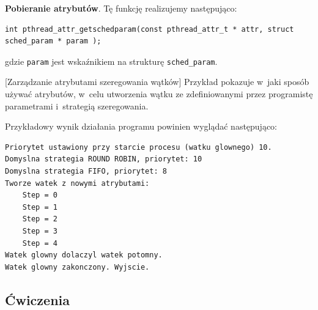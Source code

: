 \noindent\textbf{Pobieranie atrybutów}. Tę funkcję realizujemy następująco: 

\begin{lstlisting}[style=MyCStyle]
int pthread_attr_getschedparam(const pthread_attr_t * attr, struct sched_param * param );
\end{lstlisting}

gdzie \lstinline[style=MyCStyle]{param} jest wskaźnikiem na strukturę \lstinline[style=MyCStyle]{sched_param}.

\begin{example}{[Zarządzanie atrybutami szeregowania wątków]}
Przykład pokazuje w~jaki sposób używać atrybutów, w~celu utworzenia wątku ze zdefiniowanymi przez programistę parametrami i~strategią szeregowania. 



Przykładowy wynik działania programu powinien wyglądać następująco: 

\begin{lstlisting}[style=MyCStyle]
Priorytet ustawiony przy starcie procesu (watku glownego) 10.
Domyslna strategia ROUND ROBIN, priorytet: 10
Domyslna strategia FIFO, priorytet: 8
Tworze watek z nowymi atrybutami: 
	Step = 0
	Step = 1
	Step = 2
	Step = 3
	Step = 4
Watek glowny dolaczyl watek potomny.
Watek glowny zakonczony. Wyjscie.
\end{lstlisting}

\end{example}


\subsection{Ćwiczenia}

